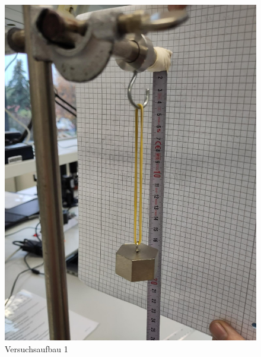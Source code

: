 \documentclass[
]{article}
\begin{document}
\begin{figure}
\centering
\includegraphics[width=\textwidth,height=0.2\textheight]{Bilder/V1B1.jpeg}
\caption{Versuchsaufbau 1}
\end{figure}
\end{document}

